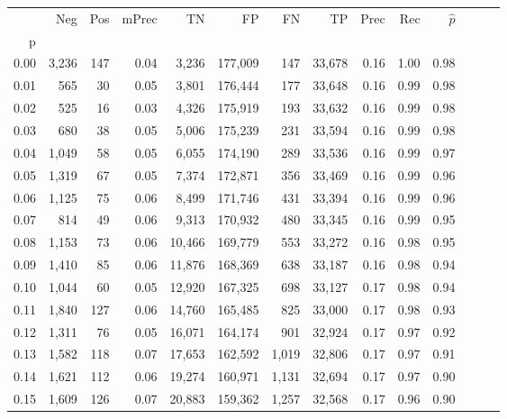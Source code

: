\begin{tabular}{rrrrrrrrrrrrrr}
\toprule
{} &    Neg &  Pos & mPrec &       TN &       FP &      FN &      TP &  Prec &   Rec & $\hat{p}$ \\
p    &        &      &       &          &          &         &         &       &       &           \\
\midrule
0.00 &  3,236 &  147 &  0.04 &    3,236 &  177,009 &     147 &  33,678 &  0.16 &  1.00 &      0.98 \\
0.01 &    565 &   30 &  0.05 &    3,801 &  176,444 &     177 &  33,648 &  0.16 &  0.99 &      0.98 \\
0.02 &    525 &   16 &  0.03 &    4,326 &  175,919 &     193 &  33,632 &  0.16 &  0.99 &      0.98 \\
0.03 &    680 &   38 &  0.05 &    5,006 &  175,239 &     231 &  33,594 &  0.16 &  0.99 &      0.98 \\
0.04 &  1,049 &   58 &  0.05 &    6,055 &  174,190 &     289 &  33,536 &  0.16 &  0.99 &      0.97 \\
0.05 &  1,319 &   67 &  0.05 &    7,374 &  172,871 &     356 &  33,469 &  0.16 &  0.99 &      0.96 \\
0.06 &  1,125 &   75 &  0.06 &    8,499 &  171,746 &     431 &  33,394 &  0.16 &  0.99 &      0.96 \\
0.07 &    814 &   49 &  0.06 &    9,313 &  170,932 &     480 &  33,345 &  0.16 &  0.99 &      0.95 \\
0.08 &  1,153 &   73 &  0.06 &   10,466 &  169,779 &     553 &  33,272 &  0.16 &  0.98 &      0.95 \\
0.09 &  1,410 &   85 &  0.06 &   11,876 &  168,369 &     638 &  33,187 &  0.16 &  0.98 &      0.94 \\
0.10 &  1,044 &   60 &  0.05 &   12,920 &  167,325 &     698 &  33,127 &  0.17 &  0.98 &      0.94 \\
0.11 &  1,840 &  127 &  0.06 &   14,760 &  165,485 &     825 &  33,000 &  0.17 &  0.98 &      0.93 \\
0.12 &  1,311 &   76 &  0.05 &   16,071 &  164,174 &     901 &  32,924 &  0.17 &  0.97 &      0.92 \\
0.13 &  1,582 &  118 &  0.07 &   17,653 &  162,592 &   1,019 &  32,806 &  0.17 &  0.97 &      0.91 \\
0.14 &  1,621 &  112 &  0.06 &   19,274 &  160,971 &   1,131 &  32,694 &  0.17 &  0.97 &      0.90 \\
0.15 &  1,609 &  126 &  0.07 &   20,883 &  159,362 &   1,257 &  32,568 &  0.17 &  0.96 &      0.90 \\

\end{tabular}
